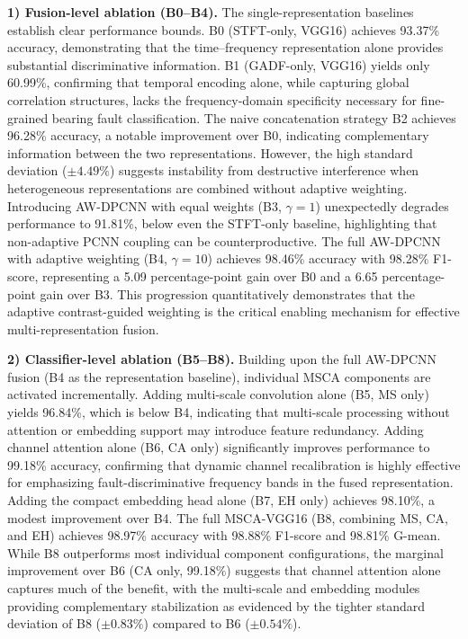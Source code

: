 \documentclass[journal]{IEEEtran}
\begin{document}
\textbf{1) Fusion-level ablation (B0--B4).} The single-representation baselines establish clear performance bounds. B0 (STFT-only, VGG16) achieves 93.37\% accuracy, demonstrating that the time--frequency representation alone provides substantial discriminative information. B1 (GADF-only, VGG16) yields only 60.99\%, confirming that temporal encoding alone, while capturing global correlation structures, lacks the frequency-domain specificity necessary for fine-grained bearing fault classification. The naive concatenation strategy B2 achieves 96.28\% accuracy, a notable improvement over B0, indicating complementary information between the two representations. However, the high standard deviation ($\pm 4.49\%$) suggests instability from destructive interference when heterogeneous representations are combined without adaptive weighting. Introducing AW-DPCNN with equal weights (B3, $\gamma=1$) unexpectedly degrades performance to 91.81\%, below even the STFT-only baseline, highlighting that non-adaptive PCNN coupling can be counterproductive. The full AW-DPCNN with adaptive weighting (B4, $\gamma=10$) achieves 98.46\% accuracy with 98.28\% F1-score, representing a 5.09 percentage-point gain over B0 and a 6.65 percentage-point gain over B3. This progression quantitatively demonstrates that the adaptive contrast-guided weighting is the critical enabling mechanism for effective multi-representation fusion.

\textbf{2) Classifier-level ablation (B5--B8).} Building upon the full AW-DPCNN fusion (B4 as the representation baseline), individual MSCA components are activated incrementally. Adding multi-scale convolution alone (B5, MS only) yields 96.84\%, which is below B4, indicating that multi-scale processing without attention or embedding support may introduce feature redundancy. Adding channel attention alone (B6, CA only) significantly improves performance to 99.18\% accuracy, confirming that dynamic channel recalibration is highly effective for emphasizing fault-discriminative frequency bands in the fused representation. Adding the compact embedding head alone (B7, EH only) achieves 98.10\%, a modest improvement over B4. The full MSCA-VGG16 (B8, combining MS, CA, and EH) achieves 98.97\% accuracy with 98.88\% F1-score and 98.81\% G-mean. While B8 outperforms most individual component configurations, the marginal improvement over B6 (CA only, 99.18\%) suggests that channel attention alone captures much of the benefit, with the multi-scale and embedding modules providing complementary stabilization as evidenced by the tighter standard deviation of B8 ($\pm 0.83\%$) compared to B6 ($\pm 0.54\%$).
\end{document}
